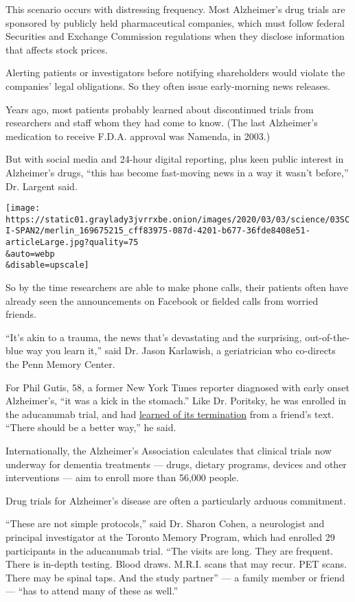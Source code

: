 This scenario occurs with distressing frequency. Most Alzheimer's drug
trials are sponsored by publicly held pharmaceutical companies, which
must follow federal Securities and Exchange Commission regulations when
they disclose information that affects stock prices.

Alerting patients or investigators before notifying shareholders would
violate the companies' legal obligations. So they often issue
early-morning news releases.

Years ago, most patients probably learned about discontinued trials from
researchers and staff whom they had come to know. (The last Alzheimer's
medication to receive F.D.A. approval was Namenda, in 2003.)

But with social media and 24-hour digital reporting, plus keen public
interest in Alzheimer's drugs, ``this has become fast-moving news in a
way it wasn't before,'' Dr. Largent said.

\texttt{[image: https://static01.graylady3jvrrxbe.onion/images/2020/03/03/science/03SCI-SPAN2/merlin\_169675215\_cff83975-087d-4201-b677-36fde8408e51-articleLarge.jpg?quality=75\\\&auto=webp\\\&disable=upscale]}

So by the time researchers are able to make phone calls, their patients
often have already seen the announcements on Facebook or fielded calls
from worried friends.

``It's akin to a trauma, the news that's devastating and the surprising,
out-of-the-blue way you learn it,'' said Dr. Jason Karlawish, a
geriatrician who co-directs the Penn Memory Center.

For Phil Gutis, 58, a former New York Times reporter diagnosed with
early onset Alzheimer's, ``it was a kick in the stomach.'' Like Dr.
Poritsky, he was enrolled in the aducanumab trial, and had
\href{https://www.nytimes3xbfgragh.onion/2019/03/22/well/mind/alzheimers-drug-trial-study-biogen-dementia-treatment-cure.html}{learned
of its termination} from a friend's text. ``There should be a better
way,'' he said.

Internationally, the Alzheimer's Association calculates that clinical
trials now underway for dementia treatments --- drugs, dietary programs,
devices and other interventions --- aim to enroll more than 56,000
people.

Drug trials for Alzheimer's disease are often a particularly arduous
commitment.

``These are not simple protocols,'' said Dr. Sharon Cohen, a neurologist
and principal investigator at the Toronto Memory Program, which had
enrolled 29 participants in the aducanumab trial. ``The visits are long.
They are frequent. There is in-depth testing. Blood draws. M.R.I. scans
that may recur. PET scans. There may be spinal taps. And the study
partner'' --- a family member or friend --- ``has to attend many of
these as well.''

